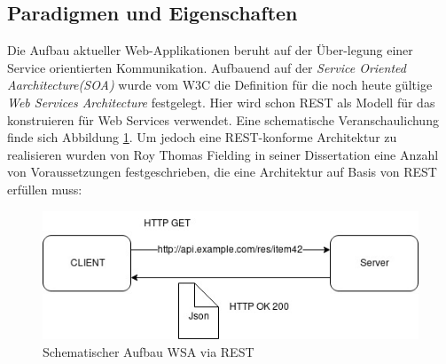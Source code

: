\documentclass[fleqn,10.5pt,ngerman]{SelfArx}
\begin{document}
\subsection{Paradigmen und Eigenschaften}
Die Aufbau aktueller Web-Applikationen beruht auf der Über-legung einer Service orientierten Kommunikation. Aufbauend auf der \textit{Service Oriented Aarchitecture(SOA)} wurde vom W3C die Definition für die noch heute gültige \textit{Web Services Architecture} \cite{WSA} festgelegt. Hier wird schon REST als Modell für das konstruieren für Web Services verwendet. Eine schematische Veranschaulichung finde sich Abbildung \ref{fig:rest}. Um jedoch eine REST-konforme Architektur zu realisieren wurden von Roy Thomas Fielding in seiner Dissertation \cite{Fielding:2000} eine Anzahl von Voraussetzungen festgeschrieben, die eine Architektur auf Basis von REST erfüllen muss:
\begin{figure}[ht]\centering
	\includegraphics[width=8.5 cm]{Abbildungen/restcommunication.jpg}
	\caption{Schematischer Aufbau WSA via REST}
	\label{fig:rest}
\end{figure}
\end{document}

